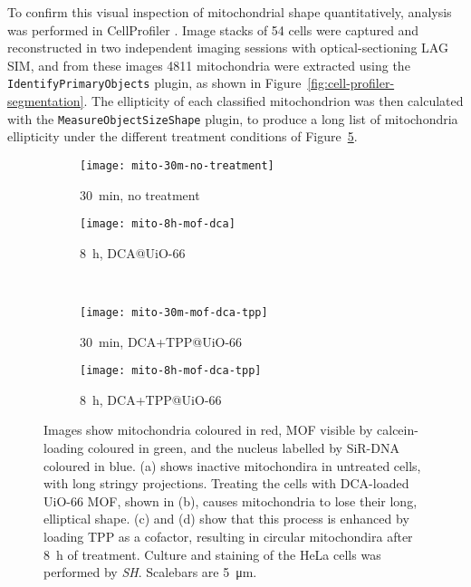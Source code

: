 To confirm this visual inspection of mitochondrial shape quantitatively, analysis was performed in CellProfiler \cite{carpenter2006cellprofiler}.
Image stacks of 54 cells were captured and reconstructed in two independent imaging sessions with optical-sectioning LAG SIM, and from these images \num{4811} mitochondria were extracted using the \texttt{IdentifyPrimaryObjects} plugin, as shown in Figure~\ref{fig:cell-profiler-segmentation}.
The ellipticity of each classified mitochondrion was then calculated with the \texttt{MeasureObjectSizeShape} plugin, to produce a long list of mitochondria ellipticity under the different treatment conditions of Figure~\ref{fig:mito-SIM-images}.

\begin{figure}[p]
\centering
	\begin{subfigure}[b]{0.49\textwidth}
	\texttt{[image: mito-30m-no-treatment]}
	\caption{\SI{30}{\minute}, no treatment} \label{fig:mito-30m-no-treatment}
	\end{subfigure}
	\hfill
	\begin{subfigure}[b]{0.49\textwidth}
	\texttt{[image: mito-8h-mof-dca]}
	\caption{\SI{8}{\hour}, DCA@UiO-66} \label{fig:mito-8h-mof-dca}
	\end{subfigure}

	~\newline
		\begin{subfigure}[b]{0.49\textwidth}
	\texttt{[image: mito-30m-mof-dca-tpp]}
	\caption{\SI{30}{\minute}, DCA+TPP@UiO-66}\label{fig:mito-30m-mof-dca-tpp}
	\end{subfigure}
	\hfill
	\begin{subfigure}[b]{0.49\textwidth}
	\texttt{[image: mito-8h-mof-dca-tpp]}
	\caption{\SI{8}{\hour}, DCA+TPP@UiO-66}\label{fig:mito-8h-mof-dca-tpp}
	\end{subfigure}
\caption[MOFs: UiO-66 MOF loaded with DCA changes mitochondria's shape]{Images show mitochondria coloured in red, MOF visible by calcein-loading coloured in green, and the nucleus labelled by SiR-DNA coloured in blue. (a) shows inactive mitochondira in untreated cells, with long stringy projections. Treating the cells with DCA-loaded UiO-66 MOF, shown in (b), causes mitochondria to lose their long, elliptical shape. (c) and (d) show that this process is enhanced by loading TPP as a cofactor, resulting in circular mitochondira after \SI{8}{\hour} of treatment. Culture and staining of the HeLa cells was performed by \textit{SH}. Scalebars are \SI{5}{\micro\metre}. }
\label{fig:mito-SIM-images}
\end{figure}

